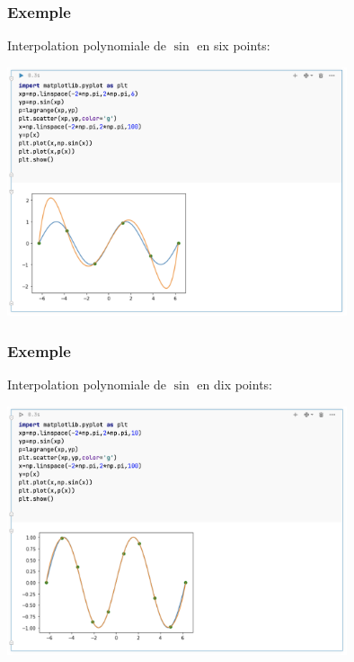 \documentclass{beamer}
\begin{document}
 \begin{frame}
 \frametitle{Exemple}
 Interpolation polynomiale de $\sin$ en six  points:

\begin{center}
\includegraphics[width=10cm]{images/interpolationDeLagrange02.png}
\end{center}

\end{frame}

 \begin{frame}
 \frametitle{Exemple}
 Interpolation polynomiale de $\sin$ en dix  points:

\begin{center}
\includegraphics[width=10cm]{images/interpolationDeLagrange03.png}
\end{center}

\end{frame}
\end{document}
